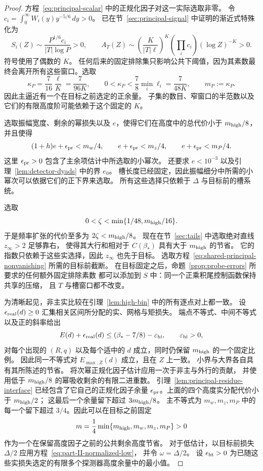 \documentclass[11pt,a4paper]{article}
\numberwithin{equation}{section}
\numberwithin{figure}{section}
\theoremstyle{definition}
\theoremstyle{remark}
\begin{document}
\begin{proof}
方程~\eqref{eq:principal-scalar} 中的正规化因子对这一实际选取非零。
令
\(c_i=\int_0^\infty W_i(y)y^{-5/6}\,dy>0\)。
已在节~\ref{sec:principal-signal} 中证明的渐近式特殊化为
\[
 S_i(Z)\sim\frac{P^{1/6}c_i}{|T|\log P}>0,\qquad
 A_T(Z)\sim
 \left(\frac{K}{|T|\ell}\right)^K
       \left(\prod_i c_i\right)(\log Z)^{-K}>0.
\]
符号使用了偶数的 \(K\)。
任何后来的固定排除集只影响公共下阈值，因为其素数最终会离开所有这些窗口。选取
\[
 \kappa_P=\frac7{16}\frac{\ell}{K}=\frac7{96K},
 \qquad 0<\kappa_P<\frac78\min_i\ell_i=\frac7{48K},
 \qquad m_P:=\kappa_P.
\]
因此主逼近有一个在目标之前选定的正余量。
子集的数目、窄窗口的半范数以及它们的有限高度阶可能依赖于这个固定的 \(K\)。

选取振幅宽度、剩余的幂损失以及 \(e\)，使得它们在高度中的总代价小于 \(m_{\rm high}/8\)，
并且使得
\[
 (1+h)e+\epsilon_{\rm pr}<m_w/4,\qquad
 e+\epsilon_{\rm pr}<m_z/4,\qquad
 e+\epsilon_{\rm pr}<m_P/4.
\]
这里 \(\epsilon_{\rm pr}>0\) 包含了主余项估计中所选取的小幂次。
还要求 \(e<10^{-3}\) 以及引理~\ref{lem:detector-dyads} 中的界 \(e_0\)。
槽长度已经固定，因此振幅细分中所需的小幂次可以依据它们的正下界来选取。
所有这些选择只依赖于 \(\Delta\) 与目标前的槽系统。

选取
\[
 0<\zeta<\min\{1/48,m_{\rm high}/16\}.
\]
于是频率扩张的代价至多为 \(2\zeta<m_{\rm high}/8\)。
现在在节~\ref{sec:tails} 中选取绝对直线 \(z_\infty>2\) 足够靠右，
使得其大行和相对于 \(C(\beta_*)\) 具有大于 \(m_{\rm high}\) 的节省。
它的指数只依赖于这些实选择，因此 \(z_\infty\) 也先于目标。
选取方程~\eqref{eq:shared-principal-nonvanishing} 所需的目标前截断。
在目标固定之后，命题~\ref{prop:probe-errors} 所要求的任何额外固定排除素数
都可以添加到 \(S\) 中：同一个正乘积尾控制函数保持共享的压缩，
且 \(T\) 与槽窗口都不改变。

为清晰起见，非主实比较在引理~\ref{lem:high-bin} 中的所有逐点对上都一致。
设 \(\epsilon_{\rm real}(d)\ge0\) 汇集相关区间所分配的实、网格与矩损失。
端点不等式、中间不等式以及正的斜率给出
\begin{equation}\label{eq:saving-criterion}
 E(d)+\epsilon_{\rm real}(d)
 \le(\beta_*-7/8)-\varepsilon_{\rm hi},
 \qquad \varepsilon_{\rm hi}>0,
\end{equation}
对每个出现的 \((R,q)\) 以及每个适中的 \(d\) 成立，同时仍保留 \(m_{\rm high}\) 的一个固定比例。
因此同一不等式对 \(E_{\max,Z}(d)\) 成立，且在 \(Z\) 上一致。
小界与大界各自具有其所陈述的节省。
将次幂正规化因子估计应用一次于非主与外行的贡献，
并使用低于 \(m_{\rm high}/8\) 的幂吸收剩余的有限二进重数。
引理~\ref{lem:principal-residue-interface} 已经包含了它自己的正规化因子余量
\(\epsilon_{\rm pr}\)。上面的四个高度实分配代价小于 \(m_{\rm high}/2\)；
这最后一个余量留下超过 \(3m_{\rm high}/8\)。
主不等式为 \(m_w,m_z,m_P\) 中的每一个留下超过 \(3/4\)。因此可以在目标之前固定
\[
 m=\frac14\min\{m_{\rm high},m_w,m_z,m_P\}>0
\]
作为一个在保留高度因子之前的公共剩余高度节省。
对于低估计，以目标前损失 \(\Delta/2\) 应用方程~\eqref{eq:part-II-normalized-low}，
并令 \(\omega=\Delta/2\)。
设 \(\epsilon_{\rm ht}>0\) 为已随这些实损失选定的有限多个探测器高度余量中的最小值。


\end{proof}
\end{document}
